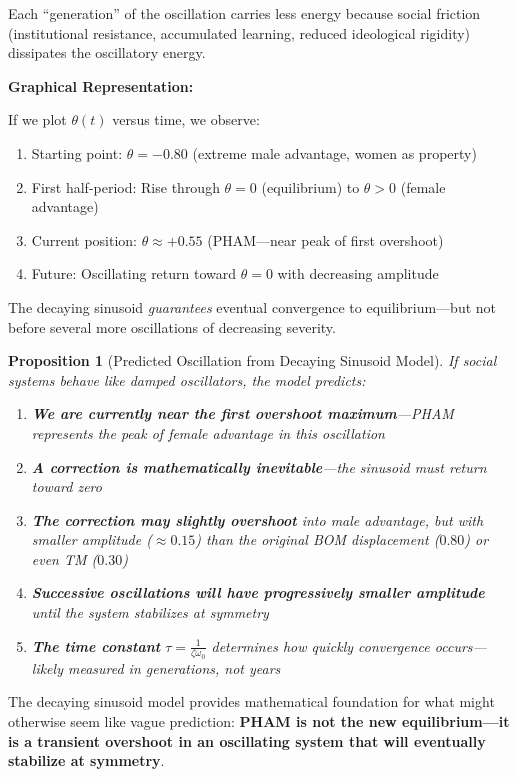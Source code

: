 \documentclass[12pt,openany]{book}
\newtheorem{proposition}{Proposition}[chapter]
\numberwithin{equation}{chapter}
\begin{document}
Each ``generation'' of the oscillation carries less energy because social friction (institutional resistance, accumulated learning, reduced ideological rigidity) dissipates the oscillatory energy.

\textbf{Graphical Representation:}

If we plot $\theta(t)$ versus time, we observe:
\begin{enumerate}
    \item Starting point: $\theta = -0.80$ (extreme male advantage, women as property)
    \item First half-period: Rise through $\theta = 0$ (equilibrium) to $\theta > 0$ (female advantage)
    \item Current position: $\theta \approx +0.55$ (PHAM---near peak of first overshoot)
    \item Future: Oscillating return toward $\theta = 0$ with decreasing amplitude
\end{enumerate}

The decaying sinusoid \textit{guarantees} eventual convergence to equilibrium---but not before several more oscillations of decreasing severity.

\begin{proposition}[Predicted Oscillation from Decaying Sinusoid Model]
If social systems behave like damped oscillators, the model predicts:
\begin{enumerate}
    \item \textbf{We are currently near the first overshoot maximum}---PHAM represents the peak of female advantage in this oscillation
    \item \textbf{A correction is mathematically inevitable}---the sinusoid must return toward zero
    \item \textbf{The correction may slightly overshoot} into male advantage, but with smaller amplitude ($\approx 0.15$) than the original BOM displacement ($0.80$) or even TM ($0.30$)
    \item \textbf{Successive oscillations will have progressively smaller amplitude} until the system stabilizes at symmetry
    \item \textbf{The time constant} $\tau = \frac{1}{\zeta\omega_0}$ determines how quickly convergence occurs---likely measured in generations, not years
\end{enumerate}
\end{proposition}

The decaying sinusoid model provides mathematical foundation for what might otherwise seem like vague prediction: \textbf{PHAM is not the new equilibrium---it is a transient overshoot in an oscillating system that will eventually stabilize at symmetry}.
\end{document}
